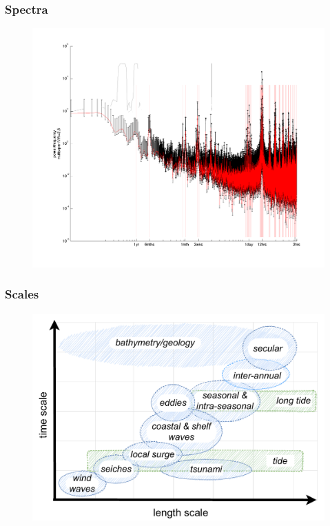 \begin{frame}
\frametitle{Spectra}
\begin{minipage}{1.0\textwidth}
    \begin{figure}      
    \includegraphics[height=0.8\textheight]{figures/plots/sealevel_spectra.png}
    \end{figure}
\end{minipage}
\hfill
\end{frame}
\begin{frame}
\frametitle{Scales}
    \begin{figure}      
    \includegraphics[height=0.8\textheight]{figures/diagrams/scales_time_length.pdf}
    \end{figure}
\end{frame}
